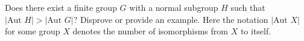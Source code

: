 Does there exist a finite group \( G\) with a normal subgroup \( H\) such that \( |\text{Aut } H| > |\text{Aut } G|\)? Disprove or provide an example. Here the notation \( |\text{Aut } X|\) for some group \( X\) denotes the number of isomorphisms from \( X\) to itself.